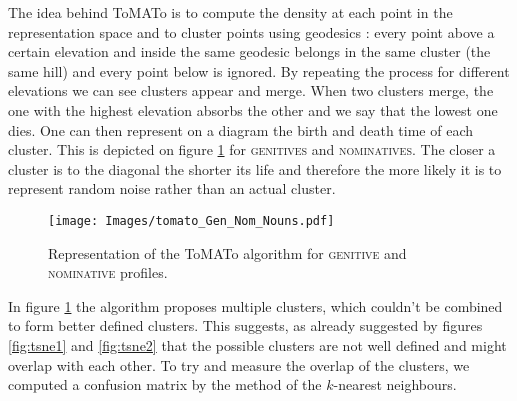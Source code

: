 \documentclass[11pt]{article}
\newcommand{\scsf}[1]{\textsc{\textsf{#1}}} %
\begin{document}
The idea behind ToMATo is to compute the density at each point in the representation space and to cluster points using geodesics : every point above a certain elevation and inside the same geodesic belongs in the same cluster (the same hill) and every point below is ignored.
By repeating the process for different elevations we can see clusters appear and merge.
When two clusters merge, the one with the highest elevation absorbs the other and we say that the lowest one dies.
One can then represent on a diagram the birth and death time of each cluster.
This is depicted on figure \ref{fig:tomato1} for \scsf{genitives} and \scsf{nominatives}.
The closer a cluster is to the diagonal the shorter its life and therefore the more likely it is to represent random noise rather than an actual cluster.

\begin{figure}[h]
  \centering
  \vspace*{-12pt}
  \texttt{[image: Images/tomato\_Gen\_Nom\_Nouns.pdf]}
  \caption{Representation of the ToMATo algorithm for \scsf{genitive} and \scsf{nominative} profiles.}
  \label{fig:tomato1}
\end{figure}

In figure \ref{fig:tomato1} the algorithm proposes multiple clusters, which couldn't be combined to form better defined clusters. 
This suggests, as already suggested by figures \ref{fig:tsne1} and \ref{fig:tsne2} that the possible clusters are not well defined and might overlap with each other. 
To try and measure the overlap of the clusters, we computed a confusion matrix by the method of the $k$-nearest neighbours. 
\end{document}
